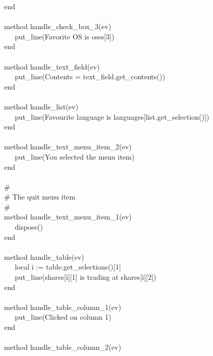 {\>   end \\
\ \\
\>   method handle\_check\_box\_3(ev) \\
\>   \ \ \ put\_line({\textquotedbl}Favorite OS is {\textquotedbl}
{\textbar}{\textbar} oses[3]) \\
\>   end \\
\ \\
\>   method handle\_text\_field(ev) \\
\>   \ \ \ put\_line({\textquotedbl}Contents = {\textquotedbl}
{\textbar}{\textbar} text\_field.get\_contents()) \\
\>   end \\
\ \\
\>   method handle\_list(ev) \\
\>   \ \ \ put\_line({\textquotedbl}Favourite language is
{\textquotedbl} {\textbar}{\textbar} languages[list.get\_selection()]) \\
\>   end \\
\ \\
\>   method handle\_text\_menu\_item\_2(ev) \\
\>   \ \ \ put\_line({\textquotedbl}You selected the menu
item{\textquotedbl}) \\
\>   end \\
\ \\
\>   \# \\
\>   \# The quit menu item \\
\>   \# \\
\>   method handle\_text\_menu\_item\_1(ev) \\
\>   \ \ \ dispose() \\
\>   end \\
\ \\
\>   method handle\_table(ev) \\
\>   \ \ \ local i := table.get\_selections()[1] \\
\>   \ \ \ put\_line(shares[i][1] {\textbar}{\textbar} {\textquotedbl}
is trading at {\textquotedbl} {\textbar}{\textbar} shares[i][2]) \\
\>   end \\
\ \\
\>   method handle\_table\_column\_1(ev) \\
\>   \ \ \ put\_line({\textquotedbl}Clicked on column
1{\textquotedbl}) \\
\>   end \\
\ \\
\>   method handle\_table\_column\_2(ev) \\
}
